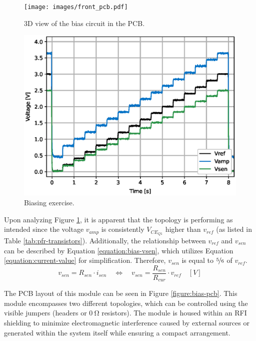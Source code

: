 \begin{figure}[!ht]
    \centering
    \begin{minipage}{0.45\textwidth}
        \centering
        \texttt{[image: images/front\_pcb.pdf]}
        \caption{3D view of the bias circuit in the PCB.}
        \label{figure:bias-pcb}
    \end{minipage}\hfill
    \begin{minipage}{0.45\textwidth}
        \centering
        \includegraphics[width=\textwidth]{images/chapter_4/channel/bias_exercise.eps}
        \caption{Biasing exercise.}
    \label{figure:bias-exercise}
    \end{minipage}
\end{figure}

Upon analyzing Figure \ref{figure:bias-exercise}, it is apparent that the topology is performing as intended since the voltage $v_{amp}$ is consistently $V_{CE_{Q1}}$ higher than $v_{ref}$ (as listed in Table \ref{tab:pfr-transistors}). Additionally, the relationship between $v_{ref}$ and $v_{sen}$ can be described by Equation \ref{equation:bias-vsen}, which utilizes Equation \ref{equation:current-value} for simplification. Therefore, $v_{sen}$ is equal to $\nicefrac{5}{6}$ of $v_{ref}$.
\begin{equation}
    v_{sen} = R_{sen} \cdot i_{sen} \quad \Leftrightarrow \quad
    v_{sen} = \frac{R_{sen}}{R_{cur}} \cdot v_{ref} \quad [V]
    \label{equation:bias-vsen}
\end{equation}

The \ac{PCB} layout of this module can be seen in Figure \ref{figure:bias-pcb}. This module encompasses two different topologies, which can be controlled using the visible jumpers (headers or $\mathrm{0~\Omega}$ resistors). The module is housed within an \ac{RFI} shielding to minimize electromagnetic interference caused by external sources or generated within the system itself while ensuring a compact arrangement.

